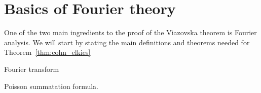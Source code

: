 
\section{Basics of Fourier theory}
One of the two main ingredients to the proof of the Viazovska theorem is Fourier analysis.
We will start by stating the main definitions and theorems needed for Theorem~\ref{thm:cohn_elkies}

\begin{definition}\label{def:fourier_trafo}
    Fourier transform
\end{definition}

\begin{theorem}
    Poisson summatation formula.
\end{theorem}

